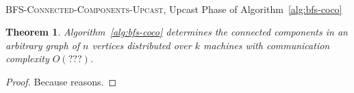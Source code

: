 \documentclass[11pt,epsf]{article}
\newtheorem{theorem}{Theorem}
\begin{document}
{{    \paragraph{}{
      \begin{algorithm}
        \footnotesize
        \caption{\textsc{BFS-Connected-Components-Upcast}, Upcast Phase of Algorithm~\ref{alg:bfs-coco} }
        \label{alg:bfs-coco-upcast}
        \begin{algorithmic}
          \ENDFOR
          \ENDFOR
        \end{algorithmic}
      \end{algorithm}
    }

    \begin{theorem}
      \label{thm:bfs-coco}
      Algorithm~\ref{alg:bfs-coco} determines the connected components in an arbitrary graph
      of $n$ vertices distributed over $k$ machines with communication complexity $O(???)$.
    \end{theorem}
    \begin{proof}
      Because reasons.
    \end{proof}
  }
}
\end{document}
